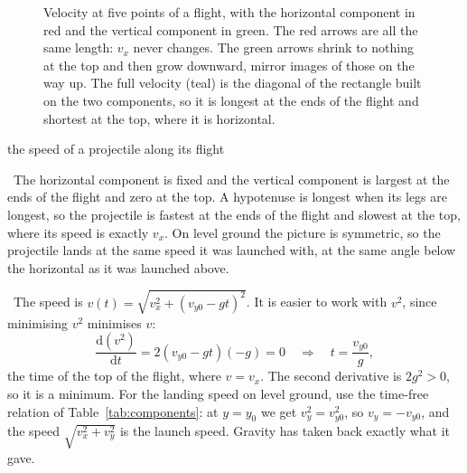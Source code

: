 \documentclass[11pt,twoside,openany]{book}
\newcommand{\dd}{\mathrm{d}}
\newcommand{\deriv}[2]{\frac{\dd #1}{\dd #2}}
\newcommand{\viewtag}[3]{\fcolorbox{#2}{#3}{\footnotesize\textbf{\textcolor{#2}{#1}}}}
\newcommand{\elemtag}{\viewtag{Elementary}{elemcol}{elempale}}
\newcommand{\calctag}{\viewtag{Calculus}{calccol}{calcpale}}
\newcommand{\elem}{\par\medskip\noindent\elemtag\ }
\newcommand{\calc}{\par\medskip\noindent\calctag\ }
\begin{document}
\begin{figure}[htb]
\centering
{}
\caption{Velocity at five points of a flight, with the horizontal component in red and the vertical component in green. The red arrows are all the same length: $v_x$ never changes. The green arrows shrink to nothing at the top and then grow downward, mirror images of those on the way up. The full velocity (teal) is the diagonal of the rectangle built on the two components, so it is longest at the ends of the flight and shortest at the top, where it is horizontal.}
\label{fig:velvectors}
\end{figure}

\begin{twoviews}{the speed of a projectile along its flight}
\elem The horizontal component is fixed and the vertical component is largest at the ends of the flight and zero at the top. A hypotenuse is longest when its legs are longest, so the projectile is fastest at the ends of the flight and slowest at the top, where its speed is exactly $v_x$. On level ground the picture is symmetric, so the projectile lands at the same speed it was launched with, at the same angle below the horizontal as it was launched above.

\calc The speed is $v(t) = \sqrt{v_x^2 + (v_{y0} - gt)^2}$. It is easier to work with $v^2$, since minimising $v^2$ minimises $v$:
\[
\deriv{(v^2)}{t} = 2(v_{y0} - gt)(-g) = 0 \quad\Longrightarrow\quad t = \frac{v_{y0}}{g},
\]
the time of the top of the flight, where $v = v_x$. The second derivative is $2g^2 > 0$, so it is a minimum. For the landing speed on level ground, use the time-free relation of Table~\ref{tab:components}: at $y = y_0$ we get $v_y^2 = v_{y0}^2$, so $v_y = -v_{y0}$, and the speed $\sqrt{v_x^2 + v_y^2}$ is the launch speed. Gravity has taken back exactly what it gave.
\end{twoviews}
\end{document}
